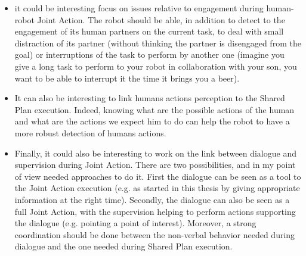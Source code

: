 \documentclass[english, a4paper,11pt,twoside]{StyleThese}
\begin{document}
\begin{itemize}
\item it could be interesting focus on issues relative to engagement during human-robot Joint Action. The robot should be able, in addition to detect to the engagement of its human partners on the current task, to deal with small distraction of its partner (without thinking the partner is disengaged from the goal) or interruptions of the task to perform by another one (imagine you give a long task to perform to your robot in collaboration with your son, you want to be able to interrupt it the time it brings you a beer).
\item It can also be interesting to link humans actions perception to the Shared Plan execution. Indeed, knowing what are the possible actions of the human and what are the actions we expect him to do can help the robot to have a more robust detection of humans actions.
\item Finally, it could also be interesting to work on the link between dialogue and supervision during Joint Action. There are two possibilities, and in my point of view needed approaches to do it. First the dialogue can be seen as a tool to the Joint Action execution (e.g. as started in this thesis by giving appropriate information at the right time). Secondly, the dialogue can also be seen as a full Joint Action, with the supervision helping to perform actions supporting the dialogue (e.g. pointing a point of interest). Moreover, a strong coordination should be done between the non-verbal behavior needed during dialogue and the one needed during Shared Plan execution.
\end{itemize}

\ifdefined{}
\else


\end{document}
